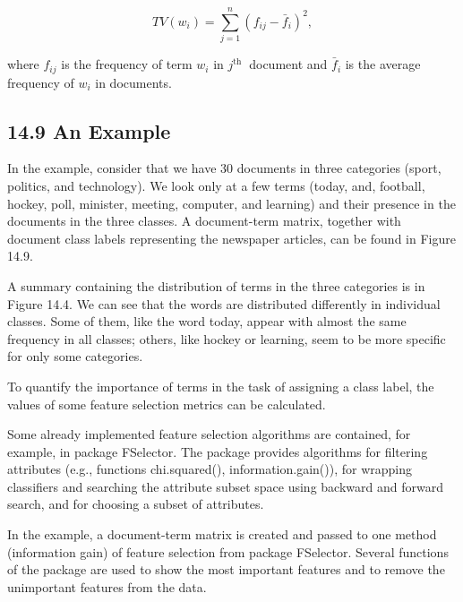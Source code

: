 \documentclass[10pt]{book}
\begin{document}
\begin{equation*}
T V\left(w_{i}\right)=\sum_{j=1}^{n}\left(f_{i j}-\bar{f}_{i}\right)^{2}, \tag{14.26}
\end{equation*}


where $f_{i j}$ is the frequency of term $w_{i}$ in $j^{\text {th }}$ document and $\bar{f}_{i}$ is the average frequency of $w_{i}$ in documents.

\subsection*{14.9 An Example}
In the example, consider that we have 30 documents in three categories (sport, politics, and technology). We look only at a few terms (today, and, football, hockey, poll, minister, meeting, computer, and learning) and their presence in the documents in the three classes. A document-term matrix, together with document class labels representing the newspaper articles, can be found in Figure 14.9.

A summary containing the distribution of terms in the three categories is in Figure 14.4. We can see that the words are distributed differently in individual classes. Some of them, like the word today, appear with almost the same frequency in all classes; others, like hockey or learning, seem to be more specific for only some categories.

To quantify the importance of terms in the task of assigning a class label, the values of some feature selection metrics can be calculated.

Some already implemented feature selection algorithms are contained, for example, in package FSelector. The package provides algorithms for filtering attributes (e.g., functions chi.squared(), information.gain()), for wrapping classifiers and searching the attribute subset space using backward and forward search, and for choosing a subset of attributes.

In the example, a document-term matrix is created and passed to one method (information gain) of feature selection from package FSelector. Several functions of the package are used to show the most important features and to remove the unimportant features from the data.
\end{document}
